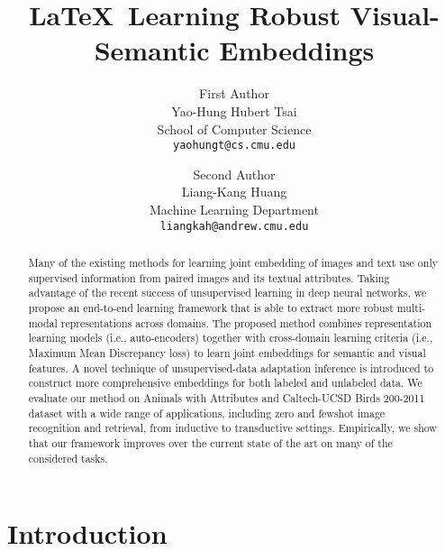 \documentclass[10pt,twocolumn,letterpaper]{article}
\begin{document}
\title{\LaTeX\ Learning Robust Visual-Semantic Embeddings}

\author{First Author\\
Yao-Hung Hubert Tsai\\
School of Computer Science\\
{\tt\small yaohungt@cs.cmu.edu}
\and
Second Author\\
Liang-Kang Huang\\
Machine Learning Department\\
{\tt\small liangkah@andrew.cmu.edu}
}

\maketitle

\begin{abstract}
   Many of the existing methods for learning joint embedding of images and text use only supervised information
from paired images and its textual attributes. Taking advantage of the recent success of unsupervised learning in
deep neural networks, we propose an end-to-end learning
framework that is able to extract more robust multi-modal
representations across domains. The proposed method combines representation learning models (i.e., auto-encoders)
together with cross-domain learning criteria (i.e., Maximum Mean Discrepancy loss) to learn joint embeddings
for semantic and visual features. A novel technique of
unsupervised-data adaptation inference is introduced to
construct more comprehensive embeddings for both labeled
and unlabeled data. We evaluate our method on Animals
with Attributes and Caltech-UCSD Birds 200-2011 dataset
with a wide range of applications, including zero and fewshot image recognition and retrieval, from inductive to
transductive settings. Empirically, we show that our framework improves over the current state of the art on many of
the considered tasks.
\end{abstract}

\section{Introduction}
\end{document}
